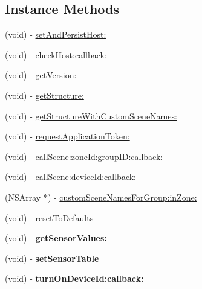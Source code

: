 \subsection*{Instance Methods}
\begin{DoxyCompactItemize}
\item 
(void) -\/ \hyperlink{interface_m_d_d_s_s_manager_a7fc82977a968af77139dfd04e407a242}{set\-And\-Persist\-Host\-:}
\item 
(void) -\/ \hyperlink{interface_m_d_d_s_s_manager_aa343aa36fdf36c13752a1f0542f04b42}{check\-Host\-:callback\-:}
\item 
(void) -\/ \hyperlink{interface_m_d_d_s_s_manager_a74358d521e85fc2a1a04f15bd8b3954e}{get\-Version\-:}
\item 
(void) -\/ \hyperlink{interface_m_d_d_s_s_manager_a372f9b7faa41788df9a0051cbb3001d6}{get\-Structure\-:}
\item 
(void) -\/ \hyperlink{interface_m_d_d_s_s_manager_af23ff713c6f0860924c0fa55cff11acd}{get\-Structure\-With\-Custom\-Scene\-Names\-:}
\item 
(void) -\/ \hyperlink{interface_m_d_d_s_s_manager_a132057831e843d4888c44f7147ad28a1}{request\-Application\-Token\-:}
\item 
(void) -\/ \hyperlink{interface_m_d_d_s_s_manager_a5380dc94b95172a6131901f23a73bd7d}{call\-Scene\-:zone\-Id\-:group\-I\-D\-:callback\-:}
\item 
(void) -\/ \hyperlink{interface_m_d_d_s_s_manager_a33e9c999b7b7547d42c4102097102ee8}{call\-Scene\-:device\-Id\-:callback\-:}
\item 
(N\-S\-Array $\ast$) -\/ \hyperlink{interface_m_d_d_s_s_manager_a879391644298f08b9dd399d69dc5b137}{custom\-Scene\-Names\-For\-Group\-:in\-Zone\-:}
\item 
(void) -\/ \hyperlink{interface_m_d_d_s_s_manager_afd4b532e4a25c628ff150eb2199515da}{reset\-To\-Defaults}
\item 
\hypertarget{interface_m_d_d_s_s_manager_aafaa7083382f6e128205d821f6adeacd}{(void) -\/ {\bfseries get\-Sensor\-Values\-:}}\label{interface_m_d_d_s_s_manager_aafaa7083382f6e128205d821f6adeacd}

\item 
\hypertarget{interface_m_d_d_s_s_manager_a88e46a8084e45775c057a1849c046ed5}{(void) -\/ {\bfseries set\-Sensor\-Table}}\label{interface_m_d_d_s_s_manager_a88e46a8084e45775c057a1849c046ed5}

\item 
\hypertarget{interface_m_d_d_s_s_manager_a13132214fe9bb3b269804c68f880707f}{(void) -\/ {\bfseries turn\-On\-Device\-Id\-:callback\-:}}\label{interface_m_d_d_s_s_manager_a13132214fe9bb3b269804c68f880707f}


\end{DoxyCompactItemize}
